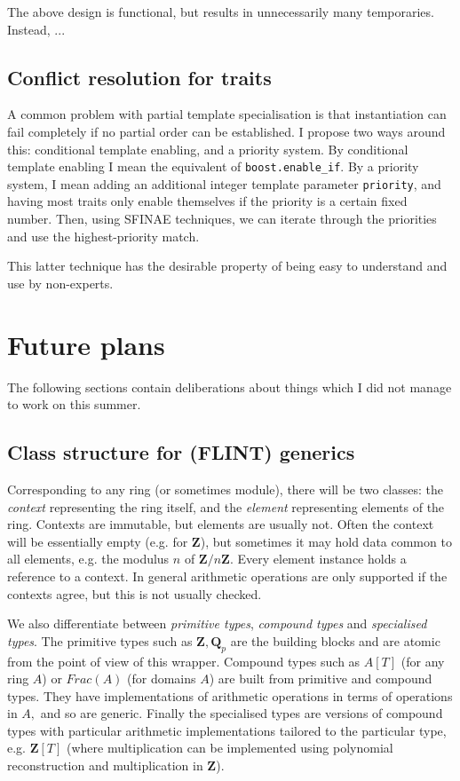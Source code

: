 \documentclass{scrartcl}
\begin{document}
The above design is functional, but results in unnecessarily many
temporaries. Instead, ...

\subsection*{Conflict resolution for traits}

A common problem with partial template specialisation is that instantiation
can fail completely if no partial order can be established. I propose two
ways around this: conditional template enabling, and a priority system. By
conditional template enabling I mean the equivalent of
\texttt{boost.enable\_if}. By a priority system, I mean adding an
additional integer template parameter \texttt{priority}, and having most
traits only enable themselves if the priority is a certain fixed number.
Then, using SFINAE techniques, we can iterate through the priorities and
use the highest-priority match.

This latter technique has the desirable property of being easy to
understand and use by non-experts.

\section*{Future plans}

The following sections contain deliberations about things which I did not
manage to work on this summer.

\subsection*{Class structure for (FLINT) generics}

Corresponding to any ring (or sometimes module),
there will be two classes: the \emph{context}
representing the ring itself, and the \emph{element} representing elements
of the ring. Contexts are immutable, but elements are usually not. Often
the context will be essentially empty (e.g. for $\mathbf{Z}$), but
sometimes it may hold data common to all elements, e.g. the modulus $n$ of
$\mathbf{Z}/n\mathbf{Z}.$ Every element instance holds a reference to a
context. In general arithmetic operations are only supported if the
contexts agree, but this is not usually checked.

We also differentiate between \emph{primitive
types}, \emph{compound types} and \emph{specialised types}. The primitive
types such as $\mathbf{Z}, \mathbf{Q}_p$
are the building blocks and are atomic from the point of view of this
wrapper. Compound types such as $A[T]$ (for any ring $A$) or $Frac(A)$ (for
domains $A$) are built from primitive and compound types. They have
implementations of arithmetic operations in terms of operations in $A,$ and
so are generic. Finally the specialised types are versions of compound
types with particular arithmetic implementations tailored to the particular
type, e.g. $\mathbf{Z}[T]$ (where multiplication can be implemented using
polynomial reconstruction and multiplication in $\mathbf{Z}$).
\end{document}
